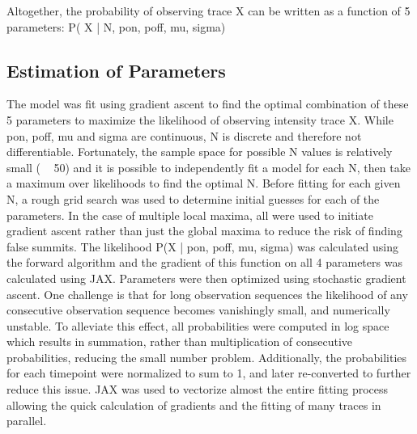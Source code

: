 
Altogether, the probability of observing trace X can be written as a function of 5 parameters:
P( X | N, pon, poff, mu, sigma)

\subsection{Estimation of Parameters}

The model was fit using gradient ascent to find the optimal combination of these 5 parameters to maximize the likelihood of observing intensity trace X. While pon, poff, mu and sigma are continuous, N is discrete and therefore not differentiable. Fortunately, the sample space for possible N values is relatively small ( ~ 50) and it is possible to independently fit a model for each N, then take a maximum over likelihoods to find the optimal N. 
Before fitting for each given N, a rough grid search was used to determine initial guesses for each of the parameters. In the case of multiple local maxima, all were used to initiate gradient ascent rather than just the global maxima to reduce the risk of finding false summits. The likelihood P(X | pon, poff, mu, sigma) was calculated using the forward algorithm and the gradient of this function on all 4 parameters was calculated using JAX. Parameters were then optimized using stochastic gradient ascent.
One challenge is that for long observation sequences the likelihood of any consecutive observation sequence becomes vanishingly small, and numerically unstable. To alleviate this effect, all probabilities were computed in log space which results in summation, rather than multiplication of consecutive probabilities, reducing the small number problem. Additionally, the probabilities for each timepoint were normalized to sum to 1, and later re-converted to further reduce this issue. JAX was used to vectorize almost the entire fitting process allowing the quick calculation of gradients and the fitting of many traces in parallel. 
